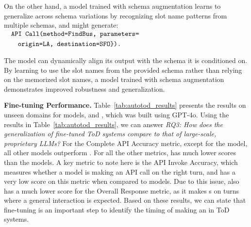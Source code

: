 On the other hand, a model trained with schema augmentation learns to generalize across schema variations by recognizing slot name patterns from multiple schemas, and might generate:
\(
\begin{aligned}
    &\quad\texttt{API Call(method=FindBus, parameters=} \\
    &\quad\quad\texttt{origin=LA, destination=SFO\}).} 
\end{aligned}
\)

The model can dynamically align its output with the schema it is conditioned on. By learning to use the slot names from the provided schema rather than relying on the memorized slot names, a model trained with schema augmentation demonstrates improved robustness and generalization.


\noindent
\textbf{Fine-tuning Performance.}
Table~\ref{tab:autotod_results} presents the results on unseen domains for {\oursys} models, and {\autotod}, which was built using GPT-4o. Using the results in Table~\ref{tab:autotod_results}, we can answer \textit{RQ3: How does the {\ood} generalization of fine-tuned ToD systems compare to that of large-scale, proprietary LLMs?}
For the Complete API Accuracy metric, except for the {\gpt} model, all other {\oursys} models outperform {\autotod}. For all the other metrics, {\autotod} has much lower scores than the {\oursys} models. 
A key metric to note here is the API Invoke Accuracy, which measures whether a model is making an API call on the right turn, and {\autotod} has a very low score on this metric when compared to {\oursys} models.
Due to this issue, {\autotod} also has a much lower score for the Overall Response metric, as it makes \apicall s on turns where a general interaction is expected. Based on these results, we can state that fine-tuning is an important step to identify the timing of making an {\apicall} in ToD systems.


